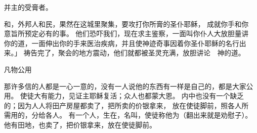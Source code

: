 {\par }{\Q 并主的受膏者。
\par }{\MM {}和{}，外邦人和{}民，果然在这城里聚集，要攻打你所膏的圣仆耶稣，
成就你手和你意旨所预定必有的事。
他们恐吓我们，现在求主鉴察，一面叫你仆人大放胆量讲你的道，一面伸出你的手来医治疾病，并且使神迹奇事因着你圣仆耶稣的名行出来。」
祷告完了，聚会的地方震动，他们就都被圣灵充满，放胆讲论　神的道。
\par }{\SH 凡物公用
\par }{\PP {}那许多信的人都是一心一意的，没有一人说他的东西有一样是自己的，都是大家公用。
使徒大有能力，见证主耶稣复活；众人也都蒙大恩。
内中也没有一个缺乏的；因为人人将田产房屋都卖了，把所卖的价银拿来，
放在使徒脚前，照各人所需用的，分给各人。
有一个{}人，生在{}，名叫{}，使徒称他为{}（{}翻出来就是劝慰子）。
他有田地，也卖了，把价银拿来，放在使徒脚前。

}
